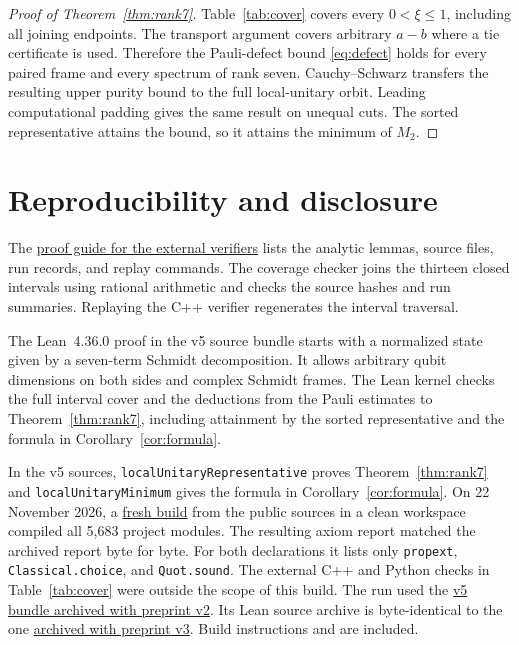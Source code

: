 \documentclass[11pt]{article}
\begin{document}
\begin{proof}[Proof of Theorem~\ref{thm:rank7}]
Table~\ref{tab:cover} covers every \(0<\xi\le1\), including all
joining endpoints. The transport argument covers arbitrary \(a-b\)
where a tie certificate is used. Therefore the Pauli-defect bound
\eqref{eq:defect} holds for every paired frame and every spectrum of
rank seven. Cauchy--Schwarz transfers the resulting upper purity bound
to the full local-unitary orbit. Leading computational padding gives
the same result on unequal cuts. The sorted representative attains
the bound, so it attains the minimum of \(M_2\).
\end{proof}

\section{Reproducibility and disclosure}

The \href{https://github.com/heming-xiao/rank-seven-stabilizer-entropy/blob/a9daab9042819dfbe8b26dd4926ffd9a9079dad9/proof/rank7_submission_proof_guide.md}{proof guide for the external verifiers}
lists the analytic lemmas, source files, run records, and replay
commands. The coverage checker joins the thirteen closed intervals
using rational arithmetic and checks the source hashes and run
summaries. Replaying the C++ verifier regenerates the interval
traversal.

The Lean~4.36.0 proof in the v5 source bundle starts with a normalized
state given by a seven-term Schmidt decomposition. It allows arbitrary
qubit dimensions on both sides and complex Schmidt frames. The Lean
kernel checks the full interval cover and the deductions from the
Pauli estimates to Theorem~\ref{thm:rank7}, including attainment by
the sorted representative and the formula in Corollary~\ref{cor:formula}.


In the v5 sources, \texttt{localUnitaryRepresentative} proves
Theorem~\ref{thm:rank7} and \texttt{localUnitaryMinimum} gives the
formula in Corollary~\ref{cor:formula}. On 22 November 2026, a \href{https://github.com/heming-xiao/rank-seven-stabilizer-entropy/blob/v3.1/certificates/rank7/reproduction-2026-11-22/README.md}{fresh build} from the public sources in a
clean workspace compiled all 5,683 project modules. The resulting
axiom report matched the archived report byte for byte. For both
declarations it lists only \texttt{propext}, \texttt{Classical.choice},
and \texttt{Quot.sound}. The external C++ and Python checks in Table~\ref{tab:cover}
were outside the scope of this build.
The run used the \href{https://doi.org/10.5281/zenodo.24421820}{v5 bundle
archived with preprint v2}. Its Lean source archive is byte-identical
to the one \href{https://doi.org/10.5281/zenodo.24424358}{archived with
preprint v3}. Build instructions and  are included.
\end{document}
